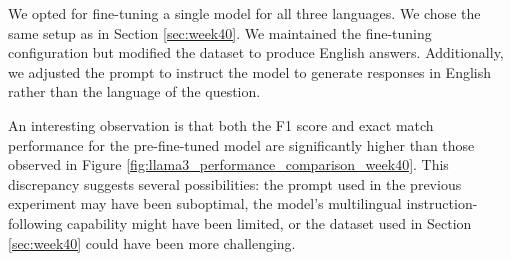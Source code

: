 \documentclass[11pt]{article}
\begin{document}
We opted for fine-tuning a single model for all three languages. We chose the same setup as in Section \ref{sec:week40}. We maintained the fine-tuning configuration but modified the dataset to produce English answers. Additionally, we adjusted the prompt to instruct the model to generate responses in English rather than the language of the question.

\begin{table}[ht]
    \centering
    \label{tab:week41_performance_comparison}
\end{table}

An interesting observation is that both the F1 score and exact match performance for the pre-fine-tuned model are significantly higher than those observed in Figure \ref{fig:llama3_performance_comparison_week40}. This discrepancy suggests several possibilities: the prompt used in the previous experiment may have been suboptimal, the model's multilingual instruction-following capability might have been limited, or the dataset used in Section \ref{sec:week40} could have been more challenging.

\begin{table}[ht]
    \centering
    \caption{Performance comparison for answerable and unanswerable questions}
    \label{tab:week41_non_answerable_performance}
\end{table}
\end{document}
